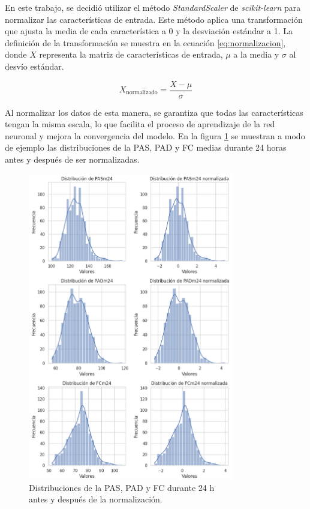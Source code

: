 En este trabajo, se decidió utilizar el método \emph{StandardScaler} de \emph{scikit-learn} \citep{CITE:50} para 
normalizar las características de entrada. Este método aplica una transformación que ajusta la 
media de cada característica a 0 y la desviación estándar a 1. La definición de la transformación 
se muestra en la ecuación \ref{eq:normalizacion}, donde $X$ representa la matriz de características de 
entrada, $\mu$ a la media y $\sigma$ al desvío estándar. 

\begin{equation}
	\label{eq:normalizacion}
	X_{\text{normalizado}} = \frac{X - \mu}{\sigma}
\end{equation}

Al normalizar los datos de esta manera, se garantiza que todas las características tengan la 
misma escala, lo que facilita el proceso de aprendizaje de la red neuronal y mejora la convergencia 
del modelo. En la figura \ref{fig:normalizacion} se muestran a modo de ejemplo las distribuciones de 
la PAS, PAD y FC medias durante 24 horas antes y después de ser normalizadas. 

\begin{figure}[h!]
	\centering
	\includegraphics[width=0.8\textwidth]{./Figures/normalizacion.png}
	\caption{Distribuciones de la PAS, PAD y FC durante 24 h \\antes y después de la normalización.}\label{fig:normalizacion}
\end{figure}

